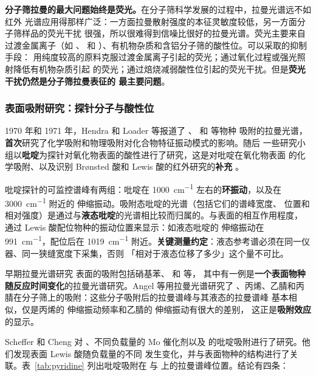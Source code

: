 \begin{pitfall}
\textbf{分子筛拉曼的最大问题始终是荧光。}在分子筛科学发展的过程中，拉曼光谱远不如红外
光谱应用得那样广泛：一方面拉曼散射强度的本征灵敏度较低，另一方面分子筛样品的荧光干扰
很强，所以很难得到信噪比很好的拉曼光谱。荧光主要来自过渡金属离子（如 、
 和 ）、有机物杂质和含铝分子筛的酸性位。可以采取的抑制手段：
用纯度较高的原料克服过渡金属离子引起的荧光；通过氧化过程或强光照射降低有机物杂质引起
的荧光；通过焙烧减弱酸性位引起的荧光干扰。但是\textbf{荧光干扰仍然是分子筛拉曼表征的
最主要问题}。
\end{pitfall}

\subsubsection{表面吸附研究：探针分子与酸性位}

1970 年和 1971 年，Hendra 和 Loader 等报道了 、 和  等物种
吸附的拉曼光谱，\textbf{首次}研究了化学吸附和物理吸附对化合物特征振动模式的影响。随后
一些研究小组以\textbf{吡啶}为探针对氧化物表面的酸性进行了研究，这是对吡啶在氧化物表面
的化学吸附、以及识别 Br\o nsted 酸和 Lewis 酸的红外研究的\textbf{补充}
。

\begin{measure}
吡啶探针的可监控谱峰有两组：吡啶在 \qty{1000}{cm^{-1}} 左右的\textbf{环振动}，以及在
\qty{3000}{cm^{-1}} 附近的  伸缩振动。吸附态吡啶的光谱（包括它们的谱峰宽度、
位置和相对强度）是通过与\textbf{液态吡啶}的光谱相比较而归属的。与表面的相互作用程度，
通过 Lewis 酸配位物种的振动位置来显示：如液态吡啶的  伸缩振动在
\qty{991}{cm^{-1}}，配位后在 \qty{1019}{cm^{-1}} 附近。\textbf{关键测量约定}：液态参考谱必须在同一仪器、同一狭缝宽度下采集，否则
「相对于液态位移了多少」这个量不可比。
\end{measure}

早期拉曼光谱研究  表面的吸附包括硝基苯、 和  等，
其中有一例是\textbf{一个表面物种随反应时间变化}的拉曼光谱研究。Angel 等用拉曼光谱研究了
、丙烯、乙腈和丙腈在分子筛上的吸附：这些分子吸附后的拉曼谱峰与其液态的拉曼谱峰
基本相似，仅是丙烯的  伸缩振动频率和乙腈的  伸缩振动有很大的差别，
这正是\textbf{吸附效应}的显示。

Scheffer 和 Cheng 对 、不同负载量的 Mo 催化剂以及
 的吡啶吸附进行了研究。他们发现表面 Lewis 酸随负载量的不同
发生变化，并与表面物种的结构进行了关联。表~\ref{tab:pyridine} 列出吡啶吸附在
 与  上的拉曼谱峰位置。结论有四条：

